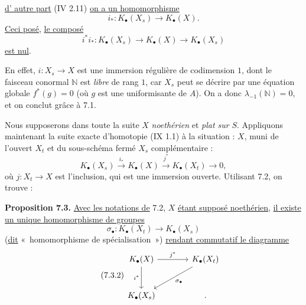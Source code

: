 
\uline{d'%
autre part} (IV 2.11) \uline{on a un homomorphisme}
\[
 i_*:K_\bullet(X_s)\longrightarrow K_\bullet(X).
\]
\uline{Ceci posé}, \uline{le composé}
\[
 i^*i_*:K_\bullet(X_s)\longrightarrow K_\bullet(X)\longrightarrow K_\bullet(X_s)
\]
\uline{est nul}.

En effet, \(i:X_s\to X\) est une immersion régulière de codimension \(1\), dont le faisceau conormal \(\mathbb N\) est \emph{libre} de rang \(1\), car \(X_s\) peut se décrire par une équation globale \(f^*(g)=0\) (où \(g\) est une uniformisante de \(A\)). On a donc \(\lambda_{-1}(\mathbb N)=0\), et on conclut grâce à 7.1.

Nous supposerons dans toute la suite \(X\) \emph{noethérien} et \emph{plat sur} \(S\). Appliquons maintenant la suite exacte d'homotopie (IX 1.1) à la situation : \(X\), muni de l'ouvert \(X_t\) et du sous-schéma fermé \(X_s\) complémentaire :
\[
K_\bullet(X_s)\xrightarrow{i_*}K_\bullet(X)\xrightarrow{j^*}K_\bullet(X_t)\longrightarrow0,
\]
où \(j:X_t\to X\) est l'inclusion, qui est une immersion ouverte. Utilisant 7.2, on trouve :

\textbf{Proposition 7.3.} \uline{Avec les notations de} 7.2, \(X\) \uline{étant supposé noethérien}, \uline{il existe un unique homomorphisme de groupes}
\begin{equation}\tag{7.3.1}
 \sigma_\bullet:K_\bullet(X_t)\longrightarrow K_\bullet(X_s)
\end{equation}
(\uline{dit} «~homomorphisme de spécialisation~») \uline{rendant commutatif le diagramme}
\begin{equation}\tag{7.3.2}
\begin{tikzcd}[column sep=large,row sep=large]
K_\bullet(X) \arrow[r,"j^*"] \arrow[d,"i^*"'] & K_\bullet(X_t) \arrow[dl,"\sigma_\bullet"]\\
K_\bullet(X_s) & {.}
\end{tikzcd}
\end{equation}



\providecommand{\Kalg}{K_{\mathrm{alg}}}
\providecommand{\Gralg}{\operatorname{Gr}_{\mathrm{alg}}}
\providecommand{\Grnum}{\operatorname{Gr}_{\mathrm{num}}}
\providecommand{\Knum}{K_{\mathrm{num}}}
\providecommand{\Cl}{\operatorname{Cl}}
\providecommand{\Ch}{\operatorname{Ch}}
\providecommand{\Nm}{\operatorname{N}}
\providecommand{\colim}{\varinjlim}
\providecommand{\Hens}{\operatorname{Hens}}
\providecommand{\Spec}{\operatorname{Spec}}
\providecommand{\coker}{\operatorname{coker}}


